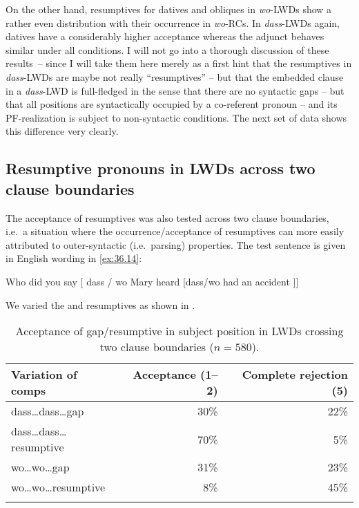 \documentclass[output=paper]{langsci/langscibook}
\begin{document}
On the other hand, resumptives for datives and obliques in \emph{wo}-\glspl{LWD} show
a rather even distribution with their occurrence in \emph{wo}-\glspl{RC}. In
\emph{dass}-\glspl{LWD} again, datives have a considerably higher acceptance whereas
the adjunct behaves similar under all conditions. I will not go into a thorough
discussion of these results~-- since I will take them here merely as a first
hint that the resumptives in \emph{dass}-\glspl{LWD} are maybe not really
\enquote{resumptives} -- but that the embedded clause in a \emph{dass}-\gls{LWD} is
full-fledged in the sense that there are no syntactic gaps -- but that all
positions are syntactically occupied by a co-referent pronoun -- and its
PF-realization is subject to non-syntactic conditions. The next set of data
shows this difference very clearly.

\subsection{Resumptive pronouns in LWDs across two clause
boundaries}\label{sub:36.3.3}

The acceptance of resumptives was also tested across two clause boundaries,
i.e.\ a situation where the occurrence/acceptance of resumptives can more
easily attributed to outer-syntactic (i.e.\ parsing) properties. The test
sentence is given in English wording in \eqref{ex:36.14}:

\ea\label{ex:36.14}
    Who did you say [ dass / wo Mary heard [dass/wo \underline{\hphantom{2em}} had an accident ]]
\z

\noindent We varied the  and resumptives as shown in .

\begin{table}
\begin{tabular}{lrr}
\lsptoprule
{Variation of comps} & {Acceptance (1--2)} & {Complete rejection (5)}\\\midrule
{dass\dots{}dass\dots{}gap} & {30\%} & {22\%}\\
{dass\dots{}dass\dots{}resumptive} & {70\%} & {5\%}\\
{wo\dots{}wo\dots{}gap} & {31\%} & {23\%}\\
{wo\dots{}wo\dots{}resumptive} & {8\%} & {45\%}\\
\lspbottomrule
\end{tabular}
\caption{Acceptance of gap/resumptive in subject position in \glspl{LWD} crossing two
clause boundaries ($n=580$).}\label{tab:36.2}
\end{table}
\end{document}
